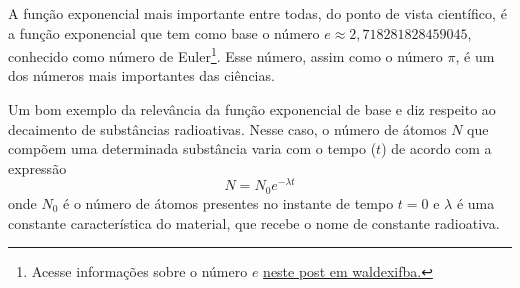 \documentclass[../main.tex]{subfiles}
\begin{document}

A função exponencial mais importante entre todas, do ponto de vista científico, é a função exponencial que tem como base o número $e\approx 2,718281828459045$, conhecido como número de Euler\footnote{Acesse informações sobre o número $e$ \href{https://waldexifba.wordpress.com/2015/12/23/onumeroe/}{neste post em waldexifba.}}. Esse número, assim como o número $\pi$, é um dos números mais importantes das ciências.

Um bom exemplo da relevância da função exponencial de base e diz respeito ao decaimento 
de substâncias radioativas.  Nesse caso, o número de átomos $N$ que compõem uma determinada 
substância varia com o tempo ($t$) de acordo com a expressão
\begin{equation}
    N=N_0e^{-\lambda t}
\end{equation}
onde $N_ 0$ é o número de átomos presentes no instante de tempo $t = 0$ e $\lambda$ é uma constante característica do material, que recebe o nome de constante radioativa.
\end{document}
